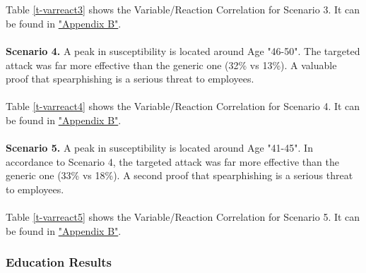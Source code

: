 \documentclass[a4paper]{article}
\begin{document}
\\ \\
Table \ref{t-varreact3} shows the Variable/Reaction Correlation for Scenario 3. It can be found in \hyperlink{appendix-varreact}{"Appendix B"}.
\\ \\
\textbf{Scenario 4.} A peak in susceptibility is located around Age "46-50". The targeted attack was far more effective than the generic one (32\% vs 13\%). A valuable proof that spearphishing is a serious threat to employees.
\\ \\
Table \ref{t-varreact4} shows the Variable/Reaction Correlation for Scenario 4. It can be found in \hyperlink{appendix-varreact}{"Appendix B"}.
\\ \\
\textbf{Scenario 5.} A peak in susceptibility is located around Age "41-45". In accordance to Scenario 4, the targeted attack was far more effective than the generic one (33\% vs 18\%). A second proof that spearphishing is a serious threat to employees.
\\ \\
Table \ref{t-varreact5} shows the Variable/Reaction Correlation for Scenario 5. It can be found in \hyperlink{appendix-varreact}{"Appendix B"}.

\subsubsection{Education Results}
\end{document}
